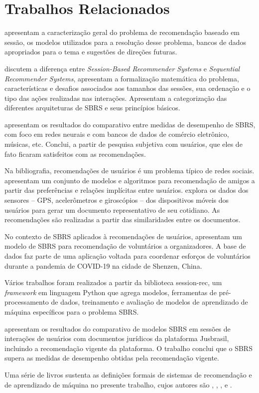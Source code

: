 \section{Trabalhos Relacionados}

\citet{rec_sys_handbook_2022} apresentam a caracterização geral do problema de recomendação
baseado em sessão, os modelos utilizados para a resolução desse problema, bancos de dados apropriados para o tema e
sugestões de direções futuras. \cite{rec_sys_handbook_2022, JLZ18,LATIFI_2021, quadrana2018sequence}

\citet{survey_wang_2021} discutem a diferença entre \textit{Session-Based Recommender Systems}
e \textit{Sequential Recommender Systems}, apresentam a formalização matemática
do problema, características e desafios associados aos tamanhos das sessões, sua
ordenação e o tipo das ações realizadas nas interações. Apresentam a
categorização das diferentes arquiteturas de SBRS e seus princípios básicos.

\citet{ludewig2021empirical}
apresentam os resultados do comparativo entre medidas de desempenho de
SBRS, com foco em redes neurais e com bancos de dados de comércio eletrônico,
músicas, etc. Conclui, a partir de pesquisa subjetiva com usuários, que eles de
fato ficaram satisfeitos com as recomendações.
\cite{ludewig2021empirical, ludewig_2018,ludewig_2019,ludewig2020advances}

Na bibliografia, recomendações de usuários é um problema típico de
redes sociais. \citet{cui2018dual} apresentam um conjunto de modelos e
algoritmos para recomendação de amigos a partir das preferências e relações
implícitas entre usuários. \citet{wang2014friendbook} explora os dados dos
sensores -- GPS, acelerômetros e giroscópios -- dos dispositivos móveis dos
usuários para gerar um documento representativo de seu cotidiano. As
recomendações são realizadas a partir das similaridades entre os documentos.

No contexto de SBRS aplicados à recomendações de usuários,
\citet{muvunza2023session} apresentam um modelo de SBRS para recomendação de
voluntários a organizadores. A base de dados faz parte de uma aplicação voltada
para coordenar esforços de voluntários durante a pandemia de COVID-19 na cidade de
Shenzen, China.

Vários trabalhos
\cite{LATIFI_2021,ludewig2021empirical,ludewig_2018,ludewig_2019,sessionrec,
jusbrasil2022} foram realizados a partir da biblioteca session-rec, um
\textit{framework} em linguagem Python que agrega modelos, ferramentas de
pré-processamento de dados, treinamento e avaliação de modelos de aprendizado de
máquina específicos para o problema SBRS.

 \citet{jusbrasil2022} apresentam os resultados do comparativo de modelos SBRS em
sessões de interações de usuários com documentos jurídicos da plataforma
Jusbrasil, incluindo a recomendação vigente da plataforma. O trabalho
conclui que o SBRS supera as medidas de desempenho obtidas pela recomendação
vigente.

Uma série de livros sustenta as definições formais de sistemas de
recomendação e de aprendizado de máquina no presente trabalho, cujos autores são
\citet{pml1Book}, \citet{jannach2011recommender}, \citet{ricci2010introduction},
\citet{mitchell1997} e \citet{aggarwal2016recommender}.